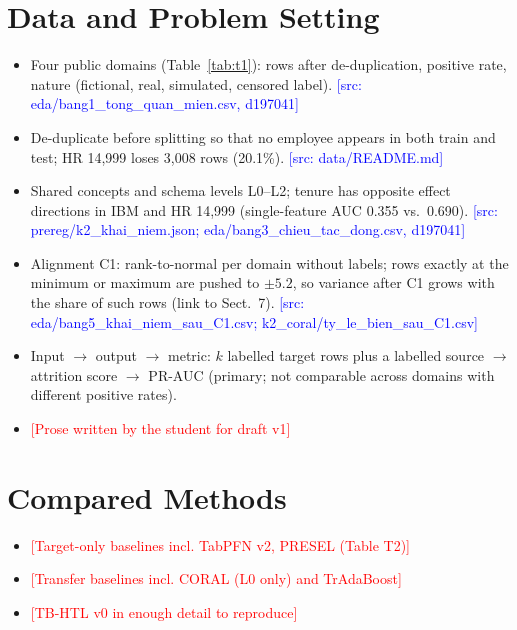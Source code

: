 \documentclass[conference]{IEEEtran}
\newcommand{\todoSV}[1]{\textcolor{red}{[#1]}}
\newcommand{\src}[1]{\textcolor{blue}{\scriptsize[src: #1]}}
\begin{document}
\section{Data and Problem Setting}  %
\begin{itemize}
  \item Four public domains (Table~\ref{tab:t1}): rows after de-duplication, positive rate, nature (fictional, real, simulated, censored label). \src{eda/bang1\_tong\_quan\_mien.csv, d197041}
  \item De-duplicate before splitting so that no employee appears in both train and test; HR 14,999 loses 3,008 rows (20.1\%). \src{data/README.md}
  \item Shared concepts and schema levels L0--L2; tenure has opposite effect directions in IBM and HR 14,999 (single-feature AUC 0.355 vs.\ 0.690). \src{prereg/k2\_khai\_niem.json; eda/bang3\_chieu\_tac\_dong.csv, d197041}
  \item Alignment C1: rank-to-normal per domain without labels; rows exactly at the minimum or maximum are pushed to $\pm5.2$, so variance after C1 grows with the share of such rows (link to Sect.~7). \src{eda/bang5\_khai\_niem\_sau\_C1.csv; k2\_coral/ty\_le\_bien\_sau\_C1.csv}
  \item Input $\to$ output $\to$ metric: $k$ labelled target rows plus a labelled source $\to$ attrition score $\to$ PR-AUC (primary; not comparable across domains with different positive rates).
  \item \todoSV{Prose written by the student for draft v1}
\end{itemize}
\begin{table}[!t]\centering\scriptsize
\caption{\todoSV{Four domains caption}}\label{tab:t1}

\end{table}

\section{Compared Methods}  %
\begin{itemize}
  \item \todoSV{Target-only baselines incl. TabPFN v2, PRESEL (Table T2)}
  \item \todoSV{Transfer baselines incl. CORAL (L0 only) and TrAdaBoost}
  \item \todoSV{TB-HTL v0 in enough detail to reproduce}
\end{itemize}
\end{document}
